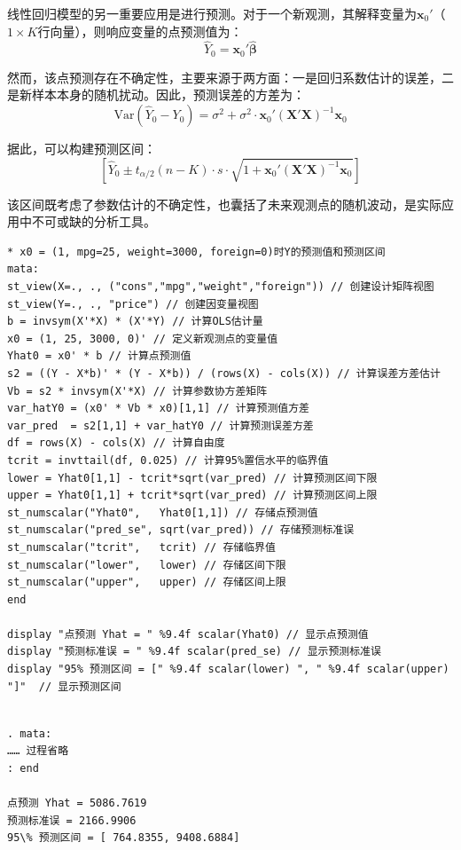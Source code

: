 线性回归模型的另一重要应用是进行预测。对于一个新观测，其解释变量为$\mathbf{x}_0'$（$1 \times K$行向量），则响应变量的点预测值为：
\begin{equation}
	\hat{Y}_0 = \mathbf{x}_0' \hat{\boldsymbol{\beta}}
\end{equation}

然而，该点预测存在不确定性，主要来源于两方面：一是回归系数估计的误差，二是新样本本身的随机扰动。因此，预测误差的方差为：
\begin{equation}
\text{Var}(\hat{Y}_0 - Y_0) = \sigma^2 + \sigma^2 \cdot \mathbf{x}_0'(\mathbf{X}'\mathbf{X})^{-1}\mathbf{x}_0
\end{equation}

据此，可以构建预测区间：
\begin{equation}
	\left[ \hat{Y}_0 \pm t_{\alpha/2}(n-K) \cdot s \cdot \sqrt{1 + \mathbf{x}_0'(\mathbf{X}'\mathbf{X})^{-1}\mathbf{x}_0} \right]
\end{equation}

该区间既考虑了参数估计的不确定性，也囊括了未来观测点的随机波动，是实际应用中不可或缺的分析工具。

\begin{tcolorbox}[title=在 Stata 的 Mata 中进行点预测与区间预测, colback=white, colframe=black, colbacktitle=white, coltitle=black,fonttitle=\bfseries]
	\begin{lstlisting}[xleftmargin=2em, commentstyle=\color{black}]
* x0 = (1, mpg=25, weight=3000, foreign=0)时Y的预测值和预测区间
mata:
st_view(X=., ., ("cons","mpg","weight","foreign")) // 创建设计矩阵视图
st_view(Y=., ., "price") // 创建因变量视图
b = invsym(X'*X) * (X'*Y) // 计算OLS估计量
x0 = (1, 25, 3000, 0)' // 定义新观测点的变量值
Yhat0 = x0' * b // 计算点预测值
s2 = ((Y - X*b)' * (Y - X*b)) / (rows(X) - cols(X)) // 计算误差方差估计
Vb = s2 * invsym(X'*X) // 计算参数协方差矩阵
var_hatY0 = (x0' * Vb * x0)[1,1] // 计算预测值方差
var_pred  = s2[1,1] + var_hatY0 // 计算预测误差方差
df = rows(X) - cols(X) // 计算自由度
tcrit = invttail(df, 0.025) // 计算95%置信水平的临界值
lower = Yhat0[1,1] - tcrit*sqrt(var_pred) // 计算预测区间下限
upper = Yhat0[1,1] + tcrit*sqrt(var_pred) // 计算预测区间上限
st_numscalar("Yhat0",   Yhat0[1,1]) // 存储点预测值
st_numscalar("pred_se", sqrt(var_pred)) // 存储预测标准误
st_numscalar("tcrit",   tcrit) // 存储临界值
st_numscalar("lower",   lower) // 存储区间下限
st_numscalar("upper",   upper) // 存储区间上限
end

display "点预测 Yhat = " %9.4f scalar(Yhat0) // 显示点预测值
display "预测标准误 = " %9.4f scalar(pred_se) // 显示预测标准误
display "95% 预测区间 = [" %9.4f scalar(lower) ", " %9.4f scalar(upper) "]"  // 显示预测区间
	\end{lstlisting}
	\vspace{-2em}
	\begin{Verbatim}[commandchars=\\\{\},xleftmargin=2em]

. mata:
…… 过程省略
: end

点预测 Yhat = 5086.7619
预测标准误 = 2166.9906
95\% 预测区间 = [ 764.8355, 9408.6884]
	\end{Verbatim}

\end{tcolorbox}

